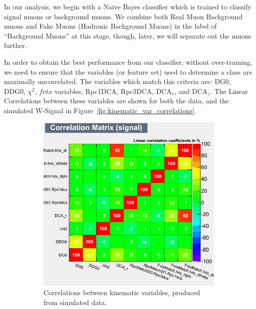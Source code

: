 In our analysis, we begin with a Naive Bayes classifier which is trained to
classify signal muons or background muons. We combine both Real Muon
Background muons and Fake Muons (Hadronic Background Muons) in the label of
``Background Muons'' at this stage, though, later, we will separate out the muons
further.

In order to obtain the best performance from our classifier, without
over-training, we need to ensure that the variables (or feature set) used to
determine a class are maximally uncorrelated. The variables which match this
criteria are: DG0, DDG0, $\chi^2$, $fvtx$ variables, Rpc1DCA, Rpc3DCA, DCA$_r$,
and DCA$_z$. The Linear Correlations between these variables are shown for both
the data, and the simulated W-Signal in
Figure~\ref{fig:kinematic_var_correlations}.

\begin{figure}[H]
	\centering
	\begin{subfigure}[t]{0.5\textwidth}
		\centering
		\includegraphics[width=0.95\linewidth]{./figures/CorrelationMatrix_Signal.png}
		\caption{Correlations between kinematic variables, produced from simulated
			data.}
		\label{fig:corr_mat_sig}
	\end{subfigure}%
  \begin{subfigure}[t]{0.5\textwidth}
		\centering

\end{subfigure}
\end{figure}
